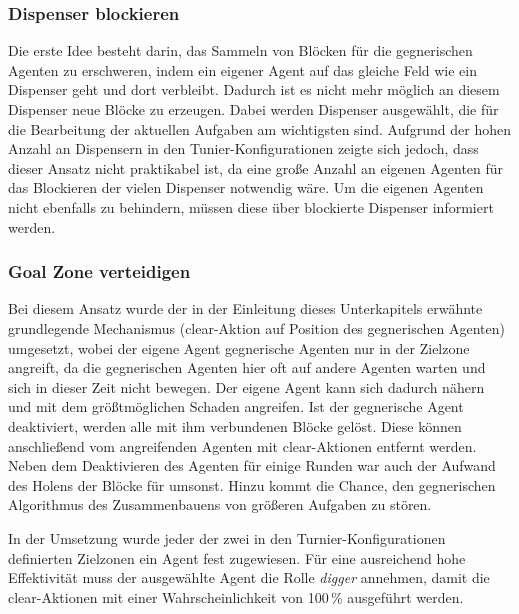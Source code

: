 \documentclass[runningheads]{llncs}
\begin{document}
	\subsubsection{Dispenser blockieren}
	Die erste Idee besteht darin, das Sammeln von Blöcken für die gegnerischen Agenten zu erschweren, indem ein eigener Agent auf das gleiche Feld wie ein Dispenser geht und dort verbleibt. Dadurch ist es nicht mehr möglich an diesem Dispenser neue Blöcke zu erzeugen. Dabei werden Dispenser ausgewählt, die für die Bearbeitung der aktuellen Aufgaben am wichtigsten sind. Aufgrund der hohen Anzahl an Dispensern in den Tunier-Konfigurationen zeigte sich jedoch, dass dieser Ansatz nicht praktikabel ist, da eine große Anzahl an eigenen Agenten für das Blockieren der vielen Dispenser notwendig wäre. Um die eigenen Agenten nicht ebenfalls zu behindern, müssen diese über blockierte Dispenser informiert werden.
	
	\subsubsection{Goal Zone verteidigen}
	Bei diesem Ansatz wurde der in der Einleitung dieses Unterkapitels erwähnte grundlegende Mechanismus (clear-Aktion auf Position des gegnerischen Agenten) umgesetzt, wobei der eigene Agent gegnerische Agenten nur in der Zielzone angreift, da die gegnerischen Agenten hier oft auf andere Agenten warten und sich in dieser Zeit nicht bewegen. Der eigene Agent kann sich dadurch nähern und mit dem größtmöglichen Schaden angreifen. Ist der gegnerische Agent deaktiviert, werden alle mit ihm verbundenen Blöcke gelöst. Diese können anschließend vom angreifenden Agenten mit clear-Aktionen entfernt werden. Neben dem Deaktivieren des Agenten für einige Runden war auch der Aufwand des Holens der Blöcke für umsonst. Hinzu kommt die Chance, den gegnerischen Algorithmus des Zusammenbauens von größeren Aufgaben zu stören.
	
	In der Umsetzung wurde jeder der zwei in den Turnier-Konfigurationen definierten Zielzonen ein Agent fest zugewiesen. Für eine ausreichend hohe Effektivität muss der ausgewählte Agent die Rolle \textit{digger} annehmen, damit die clear-Aktionen mit einer Wahrscheinlichkeit von 100\,\% ausgeführt werden.
	
\end{document}
